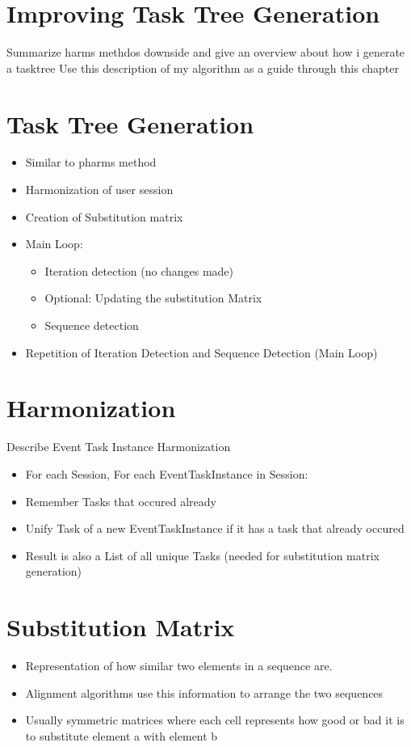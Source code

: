 \section{Improving Task Tree Generation}
Summarize harms methdos downside and give an overview about how i generate a tasktree
Use this description of my algorithm as a guide through this chapter
\section{Task Tree Generation}
	\begin{itemize}
		\item Similar to pharms method
		\item Harmonization of user session
		\item Creation of Substitution matrix
		\item Main Loop:
		\begin{itemize}
			\item Iteration detection (no changes made)
			\item Optional: Updating the substitution Matrix
			\item Sequence detection
		\end{itemize}
		\item Repetition of Iteration Detection and Sequence Detection (Main Loop)
	\end{itemize}

\section{Harmonization}
Describe Event Task Instance Harmonization
\begin{itemize}
	\item For each Session, For each EventTaskInstance in Session:
	\item Remember Tasks that occured already
	\item Unify Task of a new EventTaskInstance if it has a task that already occured
	\item Result is also a List of all unique Tasks (needed for substitution matrix generation)
\end{itemize}

\section{Substitution Matrix}
	\begin{itemize}
		\item Representation of how similar two elements in a sequence are. 
		\item Alignment algorithms use this information to arrange the two sequences 
		\item Usually symmetric matrices where each cell represents how good or bad it is to substitute element a with element b  
	\end{itemize}
